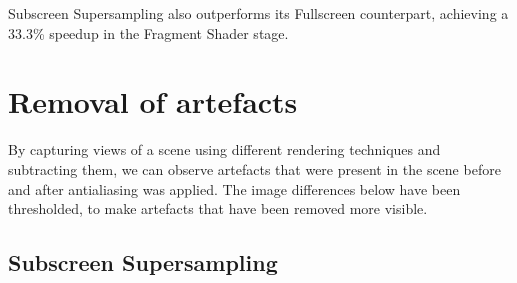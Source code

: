 \documentclass[12pt,a4paper,twoside,openright]{report}
\begin{document}
Subscreen Supersampling also outperforms its Fullscreen counterpart, achieving a 33.3\% speedup in the Fragment Shader stage. 

\clearpage
\section{Removal of artefacts}
By capturing views of a scene using different rendering techniques and subtracting them, we can observe artefacts that were present in the scene before and after antialiasing was applied. The image differences below have been thresholded, to make artefacts that have been removed more visible. 

\subsection{Subscreen Supersampling}
\end{document}
